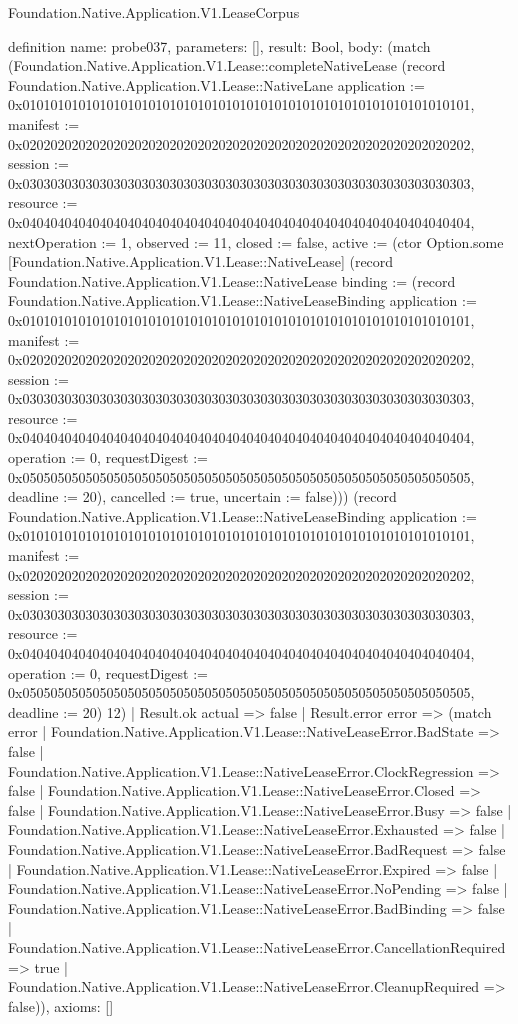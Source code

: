 \begin{lexlean}{Foundation.Native.Application.V1.LeaseCorpus}
\begin{semanticmodule}
definition{
  name: probe037,
  parameters: [],
  result: Bool,
  body: (match (Foundation.Native.Application.V1.Lease::completeNativeLease (record Foundation.Native.Application.V1.Lease::NativeLane {application := 0x0101010101010101010101010101010101010101010101010101010101010101, manifest := 0x0202020202020202020202020202020202020202020202020202020202020202, session := 0x0303030303030303030303030303030303030303030303030303030303030303, resource := 0x0404040404040404040404040404040404040404040404040404040404040404, nextOperation := 1, observed := 11, closed := false, active := (ctor Option.some [Foundation.Native.Application.V1.Lease::NativeLease] (record Foundation.Native.Application.V1.Lease::NativeLease {binding := (record Foundation.Native.Application.V1.Lease::NativeLeaseBinding {application := 0x0101010101010101010101010101010101010101010101010101010101010101, manifest := 0x0202020202020202020202020202020202020202020202020202020202020202, session := 0x0303030303030303030303030303030303030303030303030303030303030303, resource := 0x0404040404040404040404040404040404040404040404040404040404040404, operation := 0, requestDigest := 0x0505050505050505050505050505050505050505050505050505050505050505, deadline := 20}), cancelled := true, uncertain := false}))}) (record Foundation.Native.Application.V1.Lease::NativeLeaseBinding {application := 0x0101010101010101010101010101010101010101010101010101010101010101, manifest := 0x0202020202020202020202020202020202020202020202020202020202020202, session := 0x0303030303030303030303030303030303030303030303030303030303030303, resource := 0x0404040404040404040404040404040404040404040404040404040404040404, operation := 0, requestDigest := 0x0505050505050505050505050505050505050505050505050505050505050505, deadline := 20}) 12)
    | Result.ok actual => false
    | Result.error error => (match error
      | Foundation.Native.Application.V1.Lease::NativeLeaseError.BadState => false
      | Foundation.Native.Application.V1.Lease::NativeLeaseError.ClockRegression => false
      | Foundation.Native.Application.V1.Lease::NativeLeaseError.Closed => false
      | Foundation.Native.Application.V1.Lease::NativeLeaseError.Busy => false
      | Foundation.Native.Application.V1.Lease::NativeLeaseError.Exhausted => false
      | Foundation.Native.Application.V1.Lease::NativeLeaseError.BadRequest => false
      | Foundation.Native.Application.V1.Lease::NativeLeaseError.Expired => false
      | Foundation.Native.Application.V1.Lease::NativeLeaseError.NoPending => false
      | Foundation.Native.Application.V1.Lease::NativeLeaseError.BadBinding => false
      | Foundation.Native.Application.V1.Lease::NativeLeaseError.CancellationRequired => true
      | Foundation.Native.Application.V1.Lease::NativeLeaseError.CleanupRequired => false)),
  axioms: []
}


\end{semanticmodule}
\end{lexlean}
